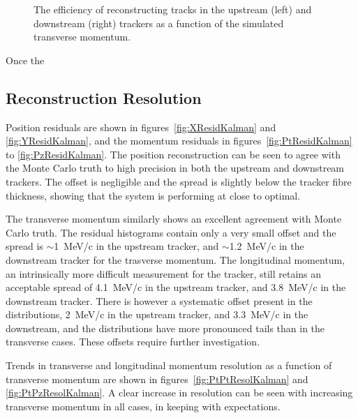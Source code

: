   \begin{figure}[p]
    \begin{center}
      \caption{\label{fig:track_efficiency_pt} The efficiency of reconstructing tracks in the upstream (left) and downstream (right) trackers as a function of the simulated transverse momentum.}
    \end{center}
  \end{figure}

  Once the 


  \subsection{Reconstruction Resolution}
  \label{sec:performance:resolutions}
  
  Position residuals are shown in figures~\ref{fig:XResidKalman} and \ref{fig:YResidKalman}, and the momentum residuals in figures~\ref{fig:PtResidKalman} to \ref{fig:PzResidKalman}.  The position reconstruction can be seen to agree with the Monte Carlo truth to high precision in both the upstream and downstream trackers. The offset is negligible and the spread is slightly below the tracker fibre thickness, showing that the system is performing at close to optimal.
  
  The transverse momentum similarly shows an excellent agreement with Monte Carlo truth. The residual histograms contain only a very small offset and the spread is $\sim$1~MeV/c in the upstream tracker, and $\sim$1.2~MeV/c in the downstream tracker for the trasverse momentum.  The longitudinal momentum, an intrinsically more difficult measurement for the tracker, still retains an acceptable spread of 4.1~MeV/c in the upstream tracker, and 3.8~MeV/c in the downstream tracker.  There is however a systematic offset present in the distributions, 2~MeV/c in the upstream tracker, and 3.3~MeV/c in the downstream, and the distributions have more pronounced tails than in the transverse cases.  These offsets require further investigation.
  
  Trends in transverse and longitudinal momentum resolution as a function of transverse momentum are shown in figures~\ref{fig:PtPtResolKalman} and \ref{fig:PtPzResolKalman}. A clear increase in resolution can be seen with increasing transverse momentum in all cases, in keeping with expectations.


